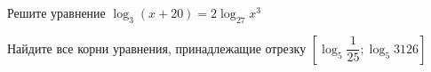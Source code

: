 \begin{ex}
	\begin{condition}
		\begin{enumcols}[label=\asbuk*)]
			\item Решите уравнение \( \log_3 (x+20) = 2\log_{27} x^3 \)
			\item Найдите все корни уравнения, принадлежащие отрезку \( \left[\log_5 \dfrac{1}{25};\log_5 3126\right] \)
		\end{enumcols}
	\end{condition}
\end{ex}